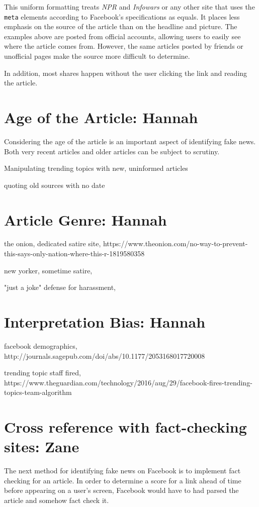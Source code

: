 \documentclass[12pt]{article}
\begin{document}
This uniform formatting treats {\it NPR} and {\it Infowars} or any other site that uses the \texttt{meta} elements according to Facebook's specifications as equals. It places less emphasis on the source of the article than on the headline and picture. The examples above are posted from official accounts, allowing users to easily see where the article comes from. However, the same articles posted by friends or unofficial pages make the source more difficult to determine.

In addition, most shares happen without the user clicking the link and reading the article.



\section{Age of the Article: Hannah}
Considering the age of the article is an important aspect of identifying fake news. Both very recent articles and older articles can be subject to scrutiny.

Manipulating trending topics with new, uninformed articles

quoting old sources with no date



\section{Article Genre: Hannah}

the onion, dedicated satire site, https://www.theonion.com/no-way-to-prevent-this-says-only-nation-where-this-r-1819580358

new yorker, sometime satire, 

"just a joke" defense for harassment, 



\section{Interpretation Bias: Hannah}

facebook demographics, http://journals.sagepub.com/doi/abs/10.1177/2053168017720008

trending topic staff fired, https://www.theguardian.com/technology/2016/aug/29/facebook-fires-trending-topics-team-algorithm



\section{Cross reference with fact-checking sites: Zane}
The next method for identifying fake news on Facebook is to implement fact checking for an article. In order to determine a score for a link ahead of time before appearing on a user's screen, Facebook would have to had parsed the article and somehow fact check it.
\end{document}
